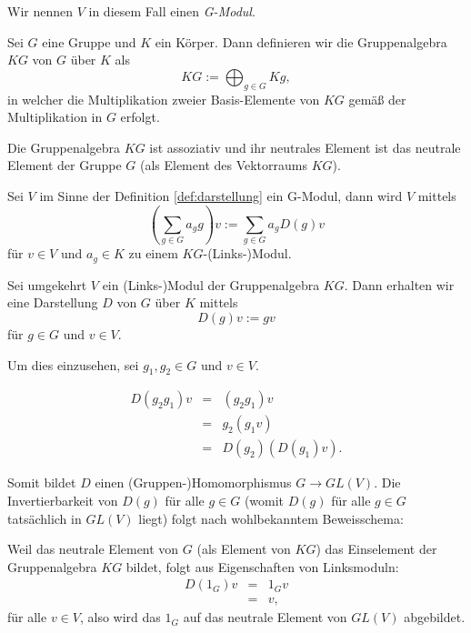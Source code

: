 \documentclass[10p,a4paper,BCOR = 12mm, DIV=15]{scrbook}
\begin{document}
{\begin{Def}
Wir nennen $V$ in diesem Fall einen \emph{G-Modul}.
\end{Def}

\begin{Def}
Sei $G$ eine Gruppe und $K$ ein Körper. Dann definieren wir die Gruppenalgebra $K G$ von $G$ über $K$ als
\begin{displaymath}
K G := \bigoplus_{g \in G} K g,
\end{displaymath}
in welcher die Multiplikation zweier Basis-Elemente von $K G$ gemäß der Multiplikation in $G$ erfolgt.
\end{Def}

\begin{Bem}
Die Gruppenalgebra $K G$ ist assoziativ und ihr neutrales Element ist das neutrale Element der Gruppe $G$ (als Element des Vektorraums $K G$).
\end{Bem}

\begin{Bem}
\label{bem:aequivalenz_darstellung_modul}
Sei $V$ im Sinne der Definition \ref{def:darstellung} ein G-Modul, dann wird $V$ mittels
\begin{displaymath}
\left(\sum_{g \in G} a_g g\right) v := \sum_{g \in G} a_g D\left(g\right) v
\end{displaymath}
für $v \in V$ und $a_g \in K$ zu einem $K G$-(Links-)Modul.

Sei umgekehrt $V$ ein (Links-)Modul der Gruppenalgebra $K G$. Dann erhalten wir eine Darstellung $D$ von $G$ über $K$ mittels
\begin{displaymath}
D\left(g\right) v := g v
\end{displaymath}
für $g \in G$ und $v \in V$. 

Um dies einzusehen, sei $g_1, g_2 \in G$ und $v \in V$.

\begin{eqnarray*}
D \left(g_2 g_1\right) v & = & \left(g_2 g_1\right) v \\
& = & g_2 \left(g_1 v\right) \\
& = & D\left(g_2\right) \left(D\left(g_1\right) v\right).
\end{eqnarray*}

Somit bildet $D$ einen (Gruppen-)Homomorphismus $G \rightarrow GL\left(V\right)$. Die Invertierbarkeit von $D\left(g\right)$ für alle $g \in G$ (womit $D\left(g\right)$ für alle $g \in G$ tatsächlich in $GL\left(V\right)$ liegt) folgt nach wohlbekanntem Beweisschema:

Weil das neutrale Element von $G$ (als Element von $K G$) das Einselement der Gruppenalgebra $K G$ bildet, folgt aus Eigenschaften von Linksmoduln:
\begin{eqnarray*}
D\left(1_G\right) v & = & 1_G v \\
& = & v,
\end{eqnarray*}
für alle $v \in V$, also wird das $1_G$ auf das neutrale Element von $GL\left(V\right)$ abgebildet.


\end{Bem}}
\end{document}
